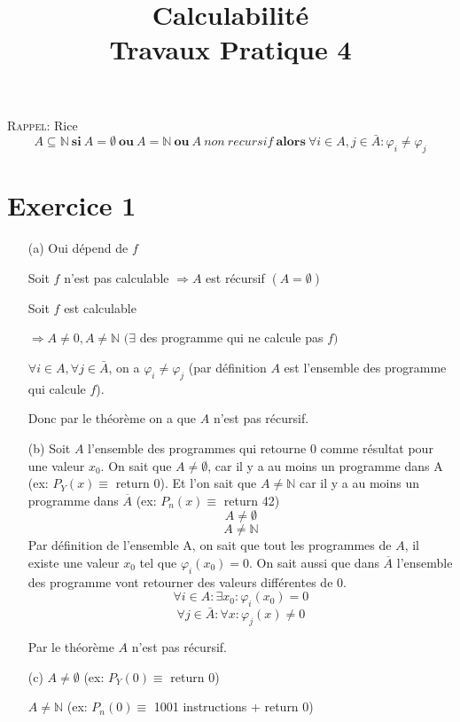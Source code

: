 \documentclass[a4paper,onecolumn,11pt]{article}
\title{Calculabilité\\Travaux Pratique 4}
\date{}
\begin{document}
\maketitle

\textsc{Rappel:} Rice
$$ A \subseteq \mathbb{N}\ \textbf{si}\ A = \emptyset\ \textbf{ou}\ A = \mathbb{N}\ \textbf{ou}\ A\ non\ recursif\ \textbf{alors}\  \forall i \in A, j \in \bar{A} : \varphi_i \neq \varphi_j$$

\section*{Exercice 1}

\begin{itemize}
	\item[(a)] Oui dépend de $f$
	
	Soit $f$ n'est pas calculable $\Rightarrow A$ est récursif $(A = \emptyset)$
	
	Soit $f$ est calculable
	
	$\Rightarrow A \neq 0, A \neq \mathbb{N}$ $(\exists$ des programme qui ne calcule pas $f)$
	
	$\forall i \in A, \forall j \in \bar{A}$, on a $\varphi_i \neq \varphi_j$ (par définition $A$ est l'ensemble des programme qui calcule $f$).
	
	Donc par le théorème on a que $A$ n'est pas récursif.
	
	\item[(b)] Soit $A$ l'ensemble des programmes qui retourne 0 comme résultat pour une valeur $x_0$. On sait que $A \neq \emptyset$, car il y a au moins un programme dans A (ex: $P_Y(x) \equiv$ return 0). Et l'on sait que  $A \neq \mathbb{N}$ car il y a au moins un programme dans $\overline{A}$ (ex: $P_n(x) \equiv$ return 42)
	$$A \neq \emptyset$$
	$$A \neq \mathbb{N}$$
	Par définition de l'ensemble A, on sait que tout les programmes de $A$, il existe une valeur $x_0$ tel que $\varphi_i(x_0) = 0$. On sait aussi que dans $\overline{A}$ l'ensemble des programme vont retourner des valeurs différentes de 0.
	$$\forall i \in A : \exists x_0 : \varphi_i(x_0) = 0$$
	$$\forall j \in \bar{A} : \forall x : \varphi_j(x) \neq 0$$
	
	Par le théorème $A$ n'est pas récursif.
	
	\item[(c)] $A \neq \emptyset$ (ex: $P_Y(0) \equiv$ return 0)
	
	$A \neq \mathbb{N}$ (ex: $P_n(0) \equiv$ 1001 instructions + return 0)
	

\end{itemize}
\end{document}
